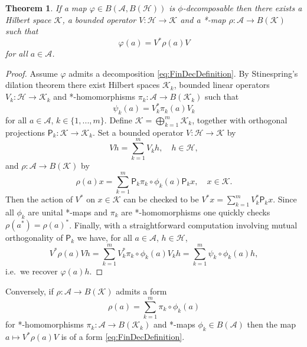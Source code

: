 \documentclass[reqno]{amsart}
\newtheorem{theorem}{Theorem}
\theoremstyle{plain}
\numberwithin{equation}{section}
\numberwithin{theorem}{section}
\numberwithin{lemma}{section}
\numberwithin{definition}{section}
\numberwithin{corollary}{section}
\numberwithin{remark}{section}
\newcommand{\proj}[1]{\mathsf{P}_{#1}}
\newcommand{\hadj}{*}
\newcommand{\hilbert}{\mathcal{H}}
\begin{document}
\begin{theorem}\label{thm:FinDecDilation}
    If a map $\varphi \in B(\mathscr{A},B(\hilbert))$ is $\phi$-decomposable then there exists a Hilbert space $\mathcal{K}$, a bounded operator $V : \hilbert \to \mathcal{K}$ and a *-map $\rho : \mathscr{A} \to B(\mathcal{K})$ such that
    \begin{equation}
        \varphi (a) = V^\hadj \rho(a) V
    \end{equation}
    for all $a \in \mathscr{A}$. 
\end{theorem}

\begin{proof}
Assume $\varphi$ admits a decomposition \eqref{eq:FinDecDefinition}. By Stinespring's dilation theorem \cite{Stinespring_1955} there exist Hilbert spaces $\mathcal{K}_k$, bounded linear operators $V_k : \hilbert \to \mathcal{K}_k$ and *-homomorphisms $\pi_k : \mathscr{A} \to B(\mathcal{K}_k)$ such that
\begin{equation}
    \psi_k (a) = V_{k}^{\hadj} \pi_k (a) V_k
\end{equation}
for all $a\in\mathscr{A}$, $k \in \{1, ... , m\}$. Define $\mathcal{K} = \bigoplus_{k=1}^{m} \mathcal{K}_k$, together with orthogonal projections $\proj{k} : \mathcal{K}\to \mathcal{K}_k$. Set a bounded operator $V : \hilbert \to \mathcal{K}$ by
\begin{equation}
    Vh = \sum_{k=1}^{m} V_k h, \quad h \in \hilbert,
\end{equation}
and $\rho : \mathscr{A} \to B(\mathcal{K})$ by
\begin{equation}\label{eq:RhoGenForm}
    \rho (a) x = \sum_{k=1}^{m} \proj{k} \pi_k \circ \phi_k (a) \proj{k} x, \quad x \in \mathcal{K}.
\end{equation}
Then the action of $V^\hadj$ on $x\in\mathcal{K}$ can be checked to be $V^\hadj x = \sum_{k=1}^{m} V_{k}^{\hadj}\proj{k}x$. Since all $\phi_k$ are unital *-maps and $\pi_k$ are *-homomorphisms one quickly checks $\rho(a^\hadj) = \rho (a)^\hadj$. Finally, with a straightforward computation involving mutual orthogonality of $\proj{k}$ we have, for all $a\in\mathscr{A}$, $h \in \hilbert$,
\begin{equation}
    V^\hadj \rho (a) Vh = \sum_{k=1}^{m} V_{k}^{\hadj} \pi_k \circ \phi_k (a) V_k h = \sum_{k=1}^{m} \psi_k \circ \phi_k (a) h,
\end{equation}
i.e.~we recover $\varphi(a)h$.
\end{proof}
Conversely, if $\rho : \mathscr{A} \to B(\mathcal{K})$ admits a form
\begin{equation}
    \rho(a) = \sum_{k=1}^{m} \pi_k \circ \phi_k (a)
\end{equation}
for *-homomorphisms $\pi_k : \mathscr{A}\to B(\mathcal{K}_k)$ and *-maps $\phi_k \in B(\mathscr{A})$ then the map $a\mapsto V^\hadj \rho (a) V$ is of a form \eqref{eq:FinDecDefinition}.
\end{document}
